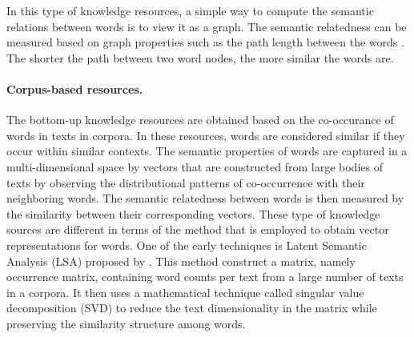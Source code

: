 In this type of knowledge resources, a simple way to compute the semantic relations between words is to view it as a graph. 
The semantic relatedness can be measured based on graph properties such as the path length between the words \cite{budanitsky06}. 
The shorter the path between two word nodes, the more similar the words are. 

\paragraph{Corpus-based resources.} 
The bottom-up knowledge resources are obtained based on the co-occurance of words in texts in corpora. 
In these resources, words are considered similar if they occur within similar contexts. 
The semantic properties of words are captured in a multi-dimensional space by vectors that are constructed from large bodies of texts by observing the distributional patterns of co-occurrence with their neighboring words. 
The semantic relatedness between words is then measured by the similarity between their corresponding vectors. 
These type of knowledge sources are different in terms of the method that is employed to obtain vector representations for words. 
One of the early techniques is Latent Semantic Analysis (LSA) proposed by . 
This method construct a matrix, namely occurrence matrix, containing word counts per text from a large number of texts in a corpora.  
It then uses a mathematical technique called singular value decomposition (SVD) \cite{} to reduce the text dimensionality in the matrix while preserving the similarity structure among words. 


